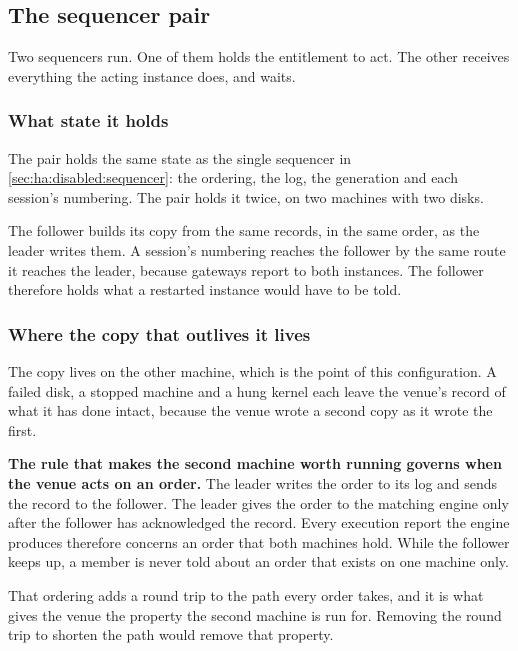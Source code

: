 \subsection{The sequencer pair}
\label{sec:ha:enabled:sequencer}

Two sequencers run. One of them holds the entitlement to act. The other receives
everything the acting instance does, and waits.

\subsubsection{What state it holds}
\label{sec:ha:enabled:sequencer:state}

The pair holds the same state as the single sequencer in
\cref{sec:ha:disabled:sequencer}: the ordering, the log, the generation and each
session's numbering. The pair holds it twice, on two machines with two disks.

The follower builds its copy from the same records, in the same order, as the
leader writes them. A session's numbering reaches the follower by the same route
it reaches the leader, because gateways report to both instances. The follower
therefore holds what a restarted instance would have to be told.

\subsubsection{Where the copy that outlives it lives}
\label{sec:ha:enabled:sequencer:durable}

The copy lives on the other machine, which is the point of this configuration. A
failed disk, a stopped machine and a hung kernel each leave the venue's record of
what it has done intact, because the venue wrote a second copy as it wrote the
first.

\textbf{The rule that makes the second machine worth running governs when the
venue acts on an order.} The leader writes the order to its log and sends the
record to the follower. The leader gives the order to the matching engine only
after the follower has acknowledged the record. Every execution report the engine
produces therefore concerns an order that both machines hold. While the follower
keeps up, a member is never told about an order that exists on one machine only.

That ordering adds a round trip to the path every order takes, and it is what
gives the venue the property the second machine is run for. Removing the round
trip to shorten the path would remove that property.

